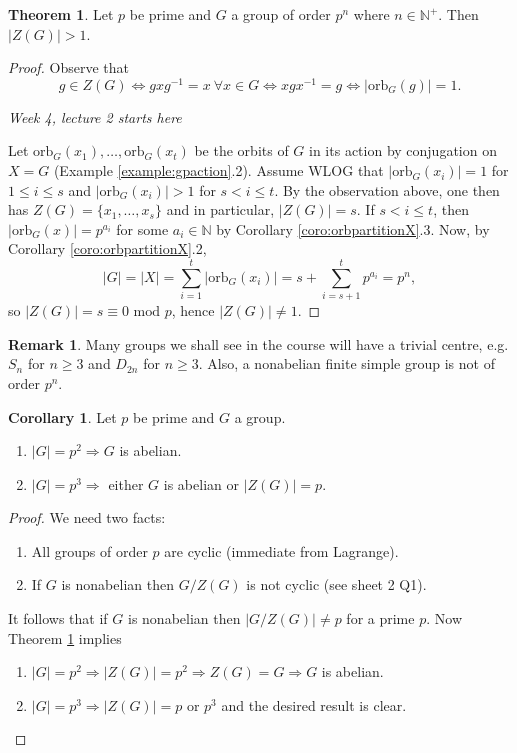 \documentclass[a4paper]{article}
\newcommand{\orb}{\text{orb}}
\newcommand{\Mod}{\text{ mod }}
\theoremstyle{definition}
\newtheorem{thm}[defn]{Theorem}
\newtheorem{coro}[defn]{Corollary}
\newtheorem*{remark}{Remark}
\begin{document}
\begin{thm}
\label{thm:primepowerordergpnontrivZ}
Let $p$ be prime and $G$ a group of order $p^n$ where $n\in\mathbb N^+$. Then $|Z(G)|>1$.
\end{thm}
\begin{proof}
Observe that
\[
g\in Z(G)\Leftrightarrow gxg^{-1}=x \ \forall x\in G \Leftrightarrow xgx^{-1}=g \Leftrightarrow |\orb_G(g)|=1.
\]

\begin{flushright}
\textit{Week 4, lecture 2 starts here}
\end{flushright}

Let $\orb_G(x_1),\ldots,\orb_G(x_t)$ be the orbits of $G$ in its action by conjugation on $X=G$ (Example \ref{example:gpaction}.2). Assume WLOG that $|\orb_G(x_i)|=1$ for $1\leq i\leq s$ and $|\orb_G(x_i)|>1$ for $s<i\leq t$. By the observation above, one then has $Z(G)=\{x_1,\ldots,x_s\}$ and in particular, $|Z(G)|=s$. If $s<i\leq t$, then $|\orb_G(x)|=p^{a_i}$ for some $a_i\in \mathbb N$ by Corollary \ref{coro:orbpartitionX}.3. Now, by Corollary \ref{coro:orbpartitionX}.2,
\[
|G|=|X|=\sum_{i=1}^t \left|\orb_G(x_i)\right|=s+\sum_{i=s+1}^t p^{a_i}=p^n,
\]
so $|Z(G)|=s\equiv 0\Mod p$, hence $|Z(G)|\neq 1$.
\end{proof}

\begin{remark}
Many groups we shall see in the course will have a trivial centre, e.g. $S_n$ for $n\geq 3$ and $D_{2n}$ for $n\geq 3$. Also, a nonabelian finite simple group is not of order $p^n$.
\end{remark}

\begin{coro}
Let $p$ be prime and $G$ a group.
\begin{enumerate}
\item $|G|=p^2\Rightarrow G$ is abelian.
\item $|G|=p^3\Rightarrow$ either $G$ is abelian or $|Z(G)|=p$.
\end{enumerate}
\end{coro}
\begin{proof}
We need two facts:
\begin{enumerate}
\item All groups of order $p$ are cyclic (immediate from Lagrange).
\item If $G$ is nonabelian then $G/Z(G)$ is not cyclic (see sheet 2 Q1).
\end{enumerate}
It follows that if $G$ is nonabelian then $|G/Z(G)|\neq p$ for a prime $p$. Now Theorem \ref{thm:primepowerordergpnontrivZ} implies
\begin{enumerate}
\item $|G|=p^2\Rightarrow |Z(G)|=p^2\Rightarrow Z(G)=G \Rightarrow G$ is abelian.
\item $|G|=p^3\Rightarrow |Z(G)|=p$ or $p^3$ and the desired result is clear.
\end{enumerate}
\end{proof}
\end{document}
